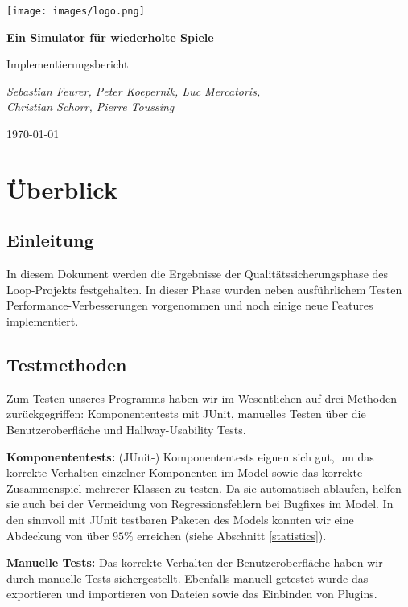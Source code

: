 \documentclass[parskip=full,11pt,openany]{scrreprt}
\begin{document}
\begin{titlepage}
	\centering
	\vspace*{5cm}
	\texttt{[image: images/logo.png]}\par
	{\huge\bfseries Ein Simulator für wiederholte Spiele\par}
	{\Large Implementierungsbericht\par}
	\vspace{2cm}
	{\Large\itshape Sebastian Feurer, Peter Koepernik, Luc Mercatoris,\\Christian Schorr, Pierre Toussing\par}
	\vfill
	{\large \today\par}
\end{titlepage}

\tableofcontents
\pagebreak

\chapter{Überblick}

\section{Einleitung}

In diesem Dokument werden die Ergebnisse der Qualitätssicherungsphase des Loop-Projekts festgehalten.
In dieser Phase wurden neben ausführlichem Testen Performance-Verbesserungen vorgenommen und noch einige neue Features implementiert.

\section{Testmethoden}

Zum Testen unseres Programms haben wir im Wesentlichen auf drei Methoden zurückgegriffen: Komponententests mit JUnit, manuelles Testen über die Benutzeroberfläche und Hallway-Usability Tests.

\textbf{Komponententests:} (JUnit-) Komponententests eignen sich gut, um das korrekte Verhalten einzelner Komponenten im Model sowie das korrekte Zusammenspiel mehrerer Klassen zu testen. Da sie automatisch ablaufen, helfen sie auch bei der Vermeidung von Regressionsfehlern bei Bugfixes im Model. In den sinnvoll mit JUnit testbaren Paketen des Models konnten wir eine Abdeckung von über \(95\%\) erreichen (siehe Abschnitt \ref{statistics}).

\textbf{Manuelle Tests: } Das korrekte Verhalten der Benutzeroberfläche haben wir durch manuelle Tests sichergestellt. Ebenfalls manuell getestet wurde das exportieren und importieren von Dateien sowie das Einbinden von Plugins.
\end{document}
